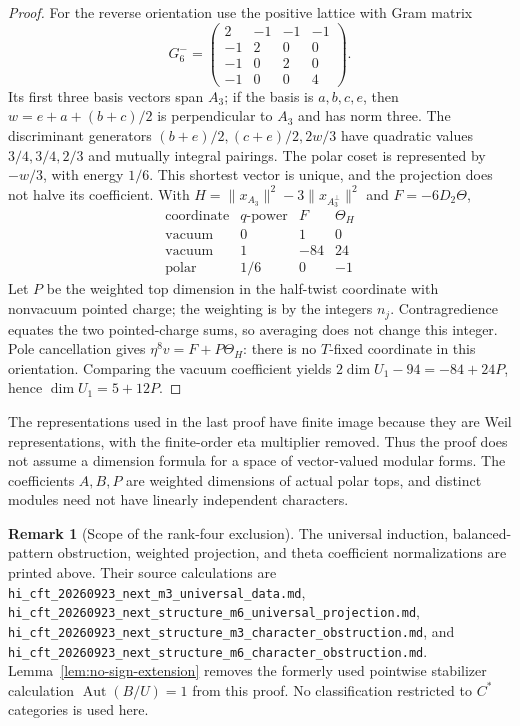 \documentclass[11pt,a4paper]{article}
\theoremstyle{definition}
\newtheorem{remark}[theorem]{Remark}
\newcommand{\artifact}[1]{\textnormal{\nolinkurl{#1}}}
\begin{document}
\begin{proof}
For the reverse orientation use the positive lattice with Gram matrix
\[
 G_6^-=
 \begin{pmatrix}2&-1&-1&-1\\-1&2&0&0\\
 -1&0&2&0\\-1&0&0&4\end{pmatrix}.
\]
Its first three basis vectors span $A_3$; if the basis is $a,b,c,e$,
then $w=e+a+(b+c)/2$ is perpendicular to $A_3$ and has norm three.
The discriminant generators $(b+e)/2,(c+e)/2,2w/3$ have quadratic
values $3/4,3/4,2/3$ and mutually integral pairings. The polar coset
is represented by $-w/3$, with energy $1/6$. This shortest vector
is unique, and the projection does not halve its coefficient.
With $H=\|x_{A_3}\|^2-3\|x_{A_3^\perp}\|^2$ and $F=-6D_2\Theta$,
\[
\begin{array}{c|c|r|r}
 \text{coordinate}&q\text{-power}&F&\Theta_H\\\hline
 \text{vacuum}&0&1&0\\
 \text{vacuum}&1&-84&24\\
 \text{polar}&1/6&0&-1
\end{array}
\]
Let $P$ be the weighted top dimension in the half-twist coordinate
with nonvacuum pointed charge; the weighting is by the integers $n_j$.
Contragredience equates the two pointed-charge sums, so averaging
does not change this integer. Pole cancellation gives
$\eta^8v=F+P\Theta_H$: there is no $T$-fixed coordinate in this
orientation. Comparing the vacuum coefficient yields
$2\dim U_1-94=-84+24P$, hence $\dim U_1=5+12P$.
\end{proof}

The representations used in the last proof have finite image because
they are Weil representations, with the finite-order eta multiplier
removed. Thus the proof does not assume a dimension formula for a
space of vector-valued modular forms. The coefficients $A,B,P$ are
weighted dimensions of actual polar tops, and distinct modules need
not have linearly independent characters.

\begin{remark}[Scope of the rank-four exclusion]
The universal induction, balanced-pattern obstruction, weighted
projection, and theta coefficient normalizations are printed above.
Their source calculations are
\artifact{hi_cft_20260923_next_m3_universal_data.md},
\artifact{hi_cft_20260923_next_structure_m6_universal_projection.md},
\artifact{hi_cft_20260923_next_structure_m3_character_obstruction.md},
and \artifact{hi_cft_20260923_next_structure_m6_character_obstruction.md}.
Lemma~\ref{lem:no-sign-extension} removes the formerly used pointwise
stabilizer calculation $\operatorname{Aut}(B/U)=1$ from this proof.
No classification restricted to $C^*$ categories is used here.
\end{remark}
\end{document}
